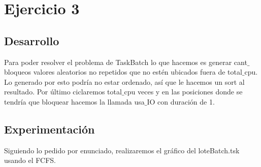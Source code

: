 
\section{Ejercicio 3}

\subsection{Desarrollo}
Para poder resolver el problema de TaskBatch lo que hacemos es generar cant$\_$bloqueos valores aleatorios no repetidos que no estén ubicados fuera de total$\_$cpu. 
Lo generado por esto podría no estar ordenado, así que le hacemos un sort al resultado. Por último ciclaremos total$\_$cpu veces y en las posiciones donde se tendría que 
bloquear hacemos la llamada usa$\_$IO con duración de 1.

\subsection{Experimentación}
Siguiendo lo pedido por enunciado, realizaremos el gráfico del loteBatch.tsk usando el FCFS. 